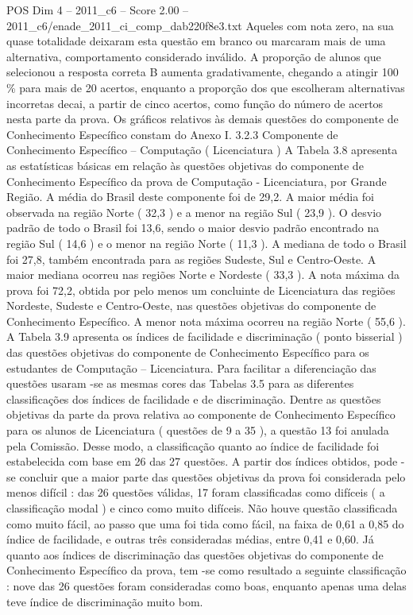 \begin{textsample}{POS Dim 4 – 2011\_c6 – Score 2.00 – 2011\_c6/enade\_2011\_ci\_comp\_dab220f8e3.txt}
Aqueles com nota zero, na sua quase totalidade deixaram esta questão em branco ou marcaram mais de uma alternativa, comportamento considerado inválido.
A proporção de alunos que selecionou a resposta correta B aumenta gradativamente, chegando a atingir 100 \% para mais de 20 acertos, enquanto a proporção dos que escolheram alternativas incorretas decai, a partir de cinco acertos, como função do número de acertos nesta parte da prova.
Os gráficos relativos às demais questões do componente de Conhecimento Específico constam do Anexo I. 3.2.3 Componente de Conhecimento Específico – Computação ( Licenciatura ) A Tabela 3.8 apresenta as estatísticas básicas em relação às questões objetivas do componente de Conhecimento Específico da prova de Computação - Licenciatura, por Grande Região.
A média do Brasil deste componente foi de 29,2.
A maior média foi observada na região Norte ( 32,3 ) e a menor na região Sul ( 23,9 ).
O desvio padrão de todo o Brasil foi 13,6, sendo o maior desvio padrão encontrado na região Sul ( 14,6 ) e o menor na região Norte ( 11,3 ).
A mediana de todo o Brasil foi 27,8, também encontrada para as regiões Sudeste, Sul e Centro-Oeste.
A maior mediana ocorreu nas regiões Norte e Nordeste ( 33,3 ).
A nota máxima da prova foi 72,2, obtida por pelo menos um concluinte de Licenciatura das regiões Nordeste, Sudeste e Centro-Oeste, nas questões objetivas do componente de Conhecimento Específico.
A menor nota máxima ocorreu na região Norte ( 55,6 ).
A Tabela 3.9 apresenta os índices de facilidade e discriminação ( ponto bisserial ) das questões objetivas do componente de Conhecimento Específico para os estudantes de Computação – Licenciatura.
Para facilitar a diferenciação das questões usaram -se as mesmas cores das Tabelas 3.5 para as diferentes classificações dos índices de facilidade e de discriminação.
Dentre as questões objetivas da parte da prova relativa ao componente de Conhecimento Específico para os alunos de Licenciatura ( questões de 9 a 35 ), a questão 13 foi anulada pela Comissão.
Desse modo, a classificação quanto ao índice de facilidade foi estabelecida com base em 26 das 27 questões.
A partir dos índices obtidos, pode -se concluir que a maior parte das questões objetivas da prova foi considerada pelo menos difícil : das 26 questões válidas, 17 foram classificadas como difíceis ( a classificação modal ) e cinco como muito difíceis.
Não houve questão classificada como muito fácil, ao passo que uma foi tida como fácil, na faixa de 0,61 a 0,85 do índice de facilidade, e outras três consideradas médias, entre 0,41 e 0,60.
Já quanto aos índices de discriminação das questões objetivas do componente de Conhecimento Específico da prova, tem -se como resultado a seguinte classificação : nove das 26 questões foram consideradas como boas, enquanto apenas uma delas teve índice de discriminação muito bom.

\end{textsample}
